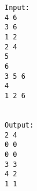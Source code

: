 \begin{verbatim}
Input:
4 6
3 6
1 2
2 4
5
6
3 5 6
4
1 2 6


Output:
2 4
0 0
0 0
3 3
4 2
1 1

\end{verbatim}